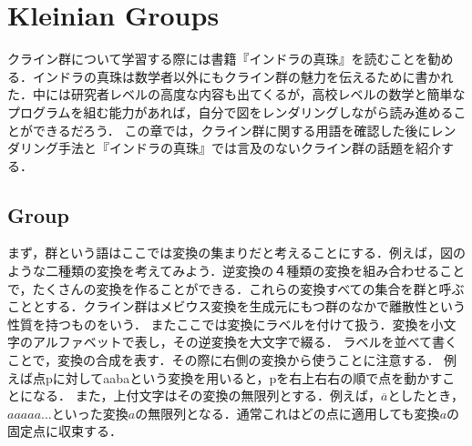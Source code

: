 
\section{Kleinian Groups}
クライン群について学習する際には書籍『インドラの真珠』\cite{indra}を読むことを勧める．インドラの真珠は数学者以外にもクライン群の魅力を伝えるために書かれた．中には研究者レベルの高度な内容も出てくるが，高校レベルの数学と簡単なプログラムを組む能力があれば，自分で図をレンダリングしながら読み進めることができるだろう．
この章では，クライン群に関する用語を確認した後にレンダリング手法と『インドラの真珠』では言及のないクライン群の話題を紹介する．

\subsection{Group}
まず，群という語はここでは変換の集まりだと考えることにする．例えば，図のような二種類の変換を考えてみよう．逆変換の４種類の変換を組み合わせることで，たくさんの変換を作ることができる．これらの変換すべての集合を群と呼ぶこととする．クライン群はメビウス変換を生成元にもつ群のなかで離散性という性質を持つものをいう．
またここでは変換にラベルを付けて扱う．変換を小文字のアルファベットで表し，その逆変換を大文字で綴る．
ラベルを並べて書くことで，変換の合成を表す．その際に右側の変換から使うことに注意する．
例えば点pに対してaabaという変換を用いると，pを右上右右の順で点を動かすことになる．
また，上付文字はその変換の無限列とする．例えば，$\overline{a}$としたとき，$aaaaa...$といった変換$a$の無限列となる．通常これはどの点に適用しても変換$a$の固定点に収束する．


